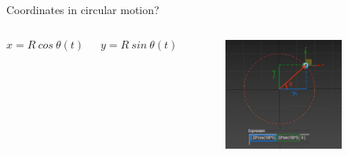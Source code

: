 \documentclass[]{beamer}
\begin{document}
 \begin{frame}

    Coordinates in circular motion?
    
 
        
   
 
           \begin{columns}[c]
             \column{2.3in}  %
  
             \begin{equation*}
                x=R~cos~\theta(t)
            \end{equation*}
 

            \begin{equation*}
                y=R~sin~\theta(t)
            \end{equation*}

             \column{2.5in}
             
       
             \begin{figure}[h!]  
                 \includegraphics[width=0.8\textwidth]{images/36.jpg}
             
               \end{figure}
               
               
               
                
          
             \end{columns}
 
 
 
      
        \end{frame}
\end{document}
